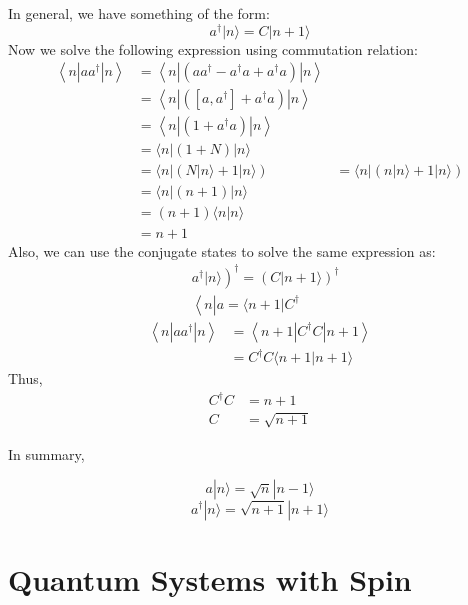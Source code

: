 \begin{mybox2}
In general, we have something of the form:
$$
a^{\dagger}|n\rangle= C|n+1\rangle
$$
Now we solve the following expression using commutation relation:
$$
\begin{aligned}
\left\langle n\left|a a^{\dagger}\right| n\right\rangle &=\left\langle n\left|\left(a a^{\dagger}-a^{\dagger} a+a^{\dagger} a\right)\right| n\right\rangle \\
&=\left\langle n\left|\left(\left[a, a^{\dagger}\right]+a^{\dagger} a\right)\right| n\right\rangle \\
&=\left\langle n\left|\left(1+a^{\dagger} a\right)\right| n\right\rangle \\
&=\langle n|(1+N)| n\rangle \\
&=\langle n|(N|n\rangle+ 1|n\rangle)
&=\langle n|(n|n\rangle+ 1|n\rangle)\\
&=\langle n|(n+1)| n\rangle\\
&=(n+1)\langle n | n\rangle\\
&=n+1
\end{aligned}
$$
Also, we can use the conjugate states to solve the same expression as:
$$
\begin{aligned}
&\left.a^{\dagger}|n\rangle\right)^{\dagger}=(C|n+1\rangle)^{\dagger}\\
&\left\langle n\left|a=\langle n+1| C^{\dagger}\right.\right.
\end{aligned}
$$
$$
\begin{aligned}
\left\langle n\left|a a^{\dagger}\right| n\right\rangle &=\left\langle n+1\left|C^{\dagger} C\right| n+1\right\rangle \\
&= C^{\dagger} C\langle n+1 | n+1\rangle
\end{aligned}
$$
Thus,
$$
\begin{aligned}
C^{\dagger} C &=n+1 \\
C &=\sqrt{n+1}
\end{aligned}
$$
\end{mybox2}
In summary,
\begin{qt}
\begin{equation}
a|n\rangle=\sqrt{n}|n-1\rangle
\end{equation}
\begin{equation}
a^{\dagger}|n\rangle =\sqrt{n+1}|n+1\rangle
\end{equation}
\end{qt}

\section{Quantum Systems with Spin}
